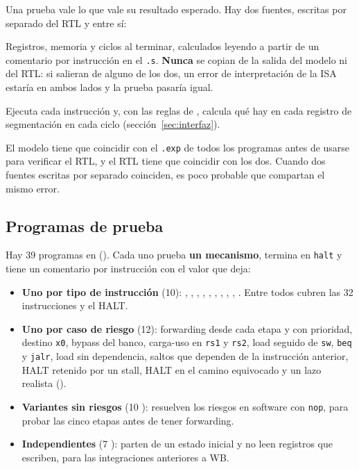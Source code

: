 Una prueba vale lo que vale su resultado esperado. Hay dos fuentes, escritas por separado del RTL
y entre sí:

\begin{description}[style=nextline,nosep,leftmargin=1.2em]
  \item[Estado esperado a mano (\repo{sw/<prog>.exp})] Registros, memoria y ciclos al terminar,
        calculados leyendo  a partir de un comentario por instrucción en el
        \texttt{.s}. \textbf{Nunca} se copian de la salida del modelo ni del RTL: si salieran de
        alguno de los dos, un error de interpretación de la ISA estaría en ambos lados y la
        prueba pasaría igual.
  \item[Modelo de referencia (\repo{tools/isasim})] Ejecuta cada instrucción y, con las reglas de
        , calcula qué hay en cada registro de segmentación en cada ciclo
        (sección~\ref{sec:interfaz}).
\end{description}

El modelo tiene que coincidir con el \texttt{.exp} de todos los programas antes de usarse para
verificar el RTL, y el RTL tiene que coincidir con los dos. Cuando dos fuentes escritas por
separado coinciden, es poco probable que compartan el mismo error.

\subsection{Programas de prueba}

Hay 39 programas en  (). Cada uno prueba \textbf{un mecanismo}, termina
en \texttt{halt} y tiene un comentario por instrucción con el valor que deja:

\begin{itemize}[nosep]
  \item \textbf{Uno por tipo de instrucción} (10): , , ,
        , , , , ,
        , . Entre todos cubren las 32 instrucciones y el HALT.
  \item \textbf{Uno por caso de riesgo} (12): forwarding desde cada etapa y con prioridad,
        destino \texttt{x0}, bypass del banco, carga-uso en \texttt{rs1} y \texttt{rs2}, load
        seguido de \texttt{sw}, \texttt{beq} y \texttt{jalr}, load sin dependencia, saltos que
        dependen de la instrucción anterior, HALT retenido por un stall, HALT en el camino
        equivocado y un lazo realista ().
  \item \textbf{Variantes sin riesgos} (10 ): resuelven los riesgos en software con
        \texttt{nop}, para probar las cinco etapas antes de tener forwarding.
  \item \textbf{Independientes} (7 ): parten de un estado inicial y no leen
        registros que escriben, para las integraciones anteriores a WB.
\end{itemize}

